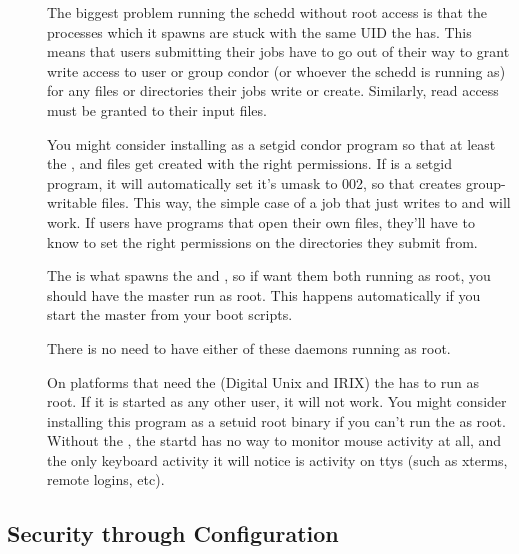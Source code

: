 \begin{description}
\item[] The biggest problem running the schedd
    without root access is that the  processes which it
    spawns are stuck with the same UID the  has.  This
    means that users submitting their jobs have to go out of their way
    to grant write access to user or group condor (or whoever the
    schedd is running as) for any files or directories their jobs
    write or create.  Similarly, read access must be granted to their
    input files.

    You might consider installing  as a setgid condor
    program so that at least the ,  and
     files get created with the right permissions.  If
     is a setgid program, it will automatically set
    it's umask to 002, so that creates group-writable files.  This
    way, the simple case of a job that just writes to 
    and  will work.  If users have programs that open
    their own files, they'll have to know to set the right permissions
    on the directories they submit from.

\item[] The  is what spawns the
     and , so if want them both running
    as root, you should have the master run as root.  This happens
    automatically if you start the master from your boot scripts.

\item[]
\item[] There is no need to have either of these
daemons running as root.

\item[] On platforms that need the  (Digital
    Unix and IRIX) the  has to run as root.  If it is
    started as any other user, it will not work.  You might consider
    installing this program as a setuid root binary if you can't run
    the  as root.  Without the , the
    startd has no way to monitor mouse activity at all, and the only
    keyboard activity it will notice is activity on ttys (such as
    xterms, remote logins, etc).

\end{description}

\subsection{\label{sec:Config-Security} Security through Configuration}

